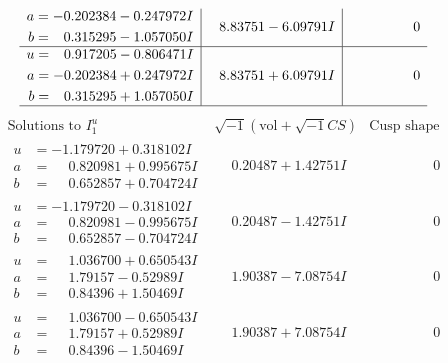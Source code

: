\documentclass[1p]{elsarticle_modified}
\theoremstyle{definition}
\newcommand{\I}{\sqrt{-1}}
\begin{document}
$$\begin{array}{c|c|c}
\begin{aligned}
a &= -0.202384 - 0.247972 I \\
b &= \phantom{-}0.315295 - 1.057050 I\end{aligned}
 & \phantom{-}8.83751 - 6.09791 I & \phantom{-0.000000 } 0 \\ \hline\begin{aligned}
u &= \phantom{-}0.917205 - 0.806471 I \\
a &= -0.202384 + 0.247972 I \\
b &= \phantom{-}0.315295 + 1.057050 I\end{aligned}
 & \phantom{-}8.83751 + 6.09791 I & \phantom{-0.000000 } 0\\
 \hline 
 \end{array}$$\newpage$$\begin{array}{c|c|c}  
\text{Solutions to }I^u_{1}& \I (\text{vol} + \sqrt{-1}CS) & \text{Cusp shape}\\
 \hline 
\begin{aligned}
u &= -1.179720 + 0.318102 I \\
a &= \phantom{-}0.820981 + 0.995675 I \\
b &= \phantom{-}0.652857 + 0.704724 I\end{aligned}
 & \phantom{-}0.20487 + 1.42751 I & \phantom{-0.000000 } 0 \\ \hline\begin{aligned}
u &= -1.179720 - 0.318102 I \\
a &= \phantom{-}0.820981 - 0.995675 I \\
b &= \phantom{-}0.652857 - 0.704724 I\end{aligned}
 & \phantom{-}0.20487 - 1.42751 I & \phantom{-0.000000 } 0 \\ \hline\begin{aligned}
u &= \phantom{-}1.036700 + 0.650543 I \\
a &= \phantom{-}1.79157 - 0.52989 I \\
b &= \phantom{-}0.84396 + 1.50469 I\end{aligned}
 & \phantom{-}1.90387 - 7.08754 I & \phantom{-0.000000 } 0 \\ \hline\begin{aligned}
u &= \phantom{-}1.036700 - 0.650543 I \\
a &= \phantom{-}1.79157 + 0.52989 I \\
b &= \phantom{-}0.84396 - 1.50469 I\end{aligned}
 & \phantom{-}1.90387 + 7.08754 I & \phantom{-0.000000 } 0 \\ \hline\begin{aligned}

\end{aligned}
\end{array}$$
\end{document}

